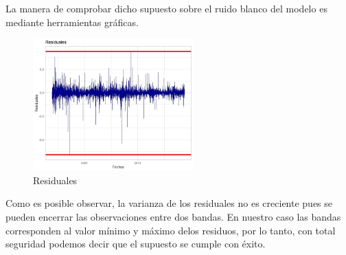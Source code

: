  La  manera  de  comprobar  dicho  supuesto  sobre  el  ruido  blanco  del  modelo  es  mediante  herramientas gráficas.
 
\begin{figure}[!h]
    \centering
    \includegraphics[width=0.55\textwidth]{Graficos/ResidualesApa.jpeg}
      \caption{Residuales}
    \label{Graficas de residuos}
\end{figure}
\bigskip

 
 Como  es  posible  observar,  la  varianza  de  los  residuales  no  es  creciente  pues  se  pueden  encerrar las observaciones entre dos bandas. En nuestro caso las bandas corresponden al valor mínimo y máximo delos residuos, por lo tanto, con total seguridad podemos decir que el supuesto se cumple con  éxito.
 
